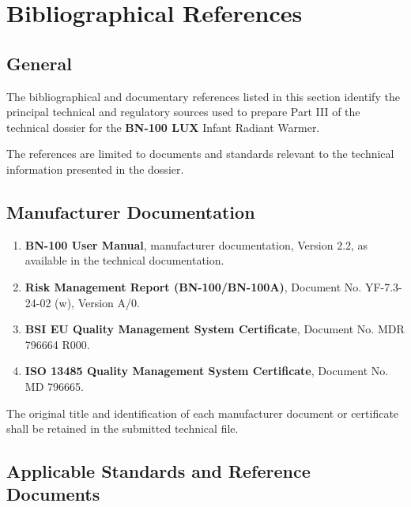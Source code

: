 

\hypertarget{p3-6}{}

\section{Bibliographical References}

\subsection{General}

The bibliographical and documentary references listed in this section
identify the principal technical and regulatory sources used to prepare
Part III of the technical dossier for the \textbf{BN-100 LUX} Infant
Radiant Warmer.

The references are limited to documents and standards relevant to the
technical information presented in the dossier.

\subsection{Manufacturer Documentation}

\begin{enumerate}

    \item \textbf{BN-100 User Manual}, manufacturer documentation,
    Version 2.2, as available in the technical documentation.

    \item \textbf{Risk Management Report (BN-100/BN-100A)},
    Document No. YF-7.3-24-02 (w), Version A/0.

    \item \textbf{BSI EU Quality Management System Certificate},
    Document No. MDR 796664 R000.

    \item \textbf{ISO 13485 Quality Management System Certificate},
    Document No. MD 796665.

\end{enumerate}

The original title and identification of each manufacturer document
or certificate shall be retained in the submitted technical file.

\subsection{Applicable Standards and Reference Documents}

